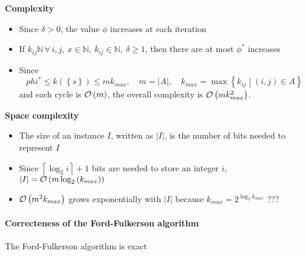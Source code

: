 \documentclass[english]{article}
\begin{document}
\bigskip
\textbf{Complexity}
\begin{itemize}
  \item Since \(\delta > 0\), the value \(\phi\) increases at each iteration
  \item If \(k_{ij} \mathbb{N} \, \forall \, i, j, \ x \in \mathbb{N}, \ \overline{k}_{ij} \in \mathbb{N}, \ \delta \geq 1\), then there are at most \(\phi^\ast\) increases
  \item Since
        \[ phi^\ast \leq k\left( \left\{ s \right\} \right) \leq m k_{max}, \quad m = |A|, \quad k_{max} = \max\left\{ k_{ij} \middle\vert \left( i, j \right) \in A \right\} \]
        and each cycle is \(\mathcal{O}\left(m\right)\), the overall complexity is \(\mathcal{O}\left(m k_{max}^2\right)\).
\end{itemize}

\textbf{Space complexity}
\begin{itemize}
  \item The size of an instance \(I\), written as \(|I|\), is the number of bits needed to represent \(I\)
  \item Since \(\left\lceil{\log_2{i}}\right\rceil + 1\) bits are needed to store an integer \(i\), \(|I| = \mathcal{O}\left(m \log_2{\left( k_{max} \right)}\right)\)
  \item \(\mathcal{O}\left(m^2 k_{max}\right)\) grows exponentially with \(|I|\) because \(k_{max} = 2^{\log_2{k_{max}}}\) ??? %
\end{itemize}

\paragraph{Correcteness of the Ford-Fulkerson algorithm}

\begin{proposition}
  The Ford-Fulkerson algorithm is exact
\end{proposition}
\end{document}
